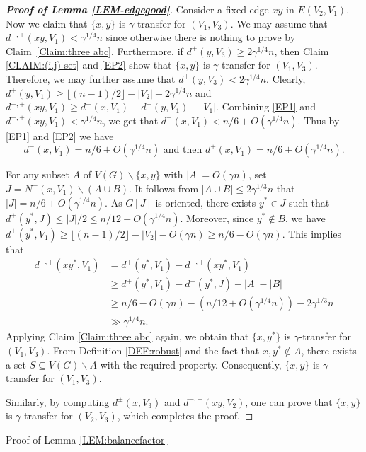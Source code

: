 \documentclass[11pt,a4paper,reqno]{amsart}
\makeatletter
\renewcommand\section{\@startsection{section}{1}%
  \z@{-1.0\linespacing\@plus-.7\linespacing}{1\linespacing}%
  {\normalfont\bfseries\large\centering}}
\theoremstyle{definition} %
\makeatother
\begin{document}
\begin{proof}[\textbf{Proof of Lemma \ref{LEM-edgegood}}]
Consider a fixed edge $xy$ in $E(V_2,V_1)$. Now we claim that $\{x,y\}$ is $\gamma$-transfer for $(V_1,V_3)$.  We may assume that $d^{-,+}(xy,V_1)<\gamma^{1/4}n$ since otherwise there is nothing to prove by Claim~\ref{Claim:three abc}. Furthermore,  if $d^+(y,V_{3})\geqslant2\gamma^{1/4}n$, then Claim \ref{CLAIM:(i,j)-set} and \ref{EP2} show that $\{x,y\}$ is $\gamma$-transfer for $(V_1,V_3)$.  Therefore, we may further assume that $d^+(y,V_{3})<2\gamma^{1/4}n$. Clearly,  $d^+(y,V_1)\geqslant \lfloor(n-1)/2\rfloor-|V_2|-2\gamma^{1/4}n$ and $d^{-,+}(xy,V_1)\geqslant d^-(x,V_1)+d^+(y,V_1)-|V_1|$. Combining \ref{EP1} and $d^{-,+}(xy,V_1)<\gamma^{1/4}n$, we get that $d^-(x,V_1)<n/6+O(\gamma^{1/4}n)$. Thus by \ref{EP1} and \ref{EP2} we have $$d^-(x,V_1)=n/6\pm O(\gamma^{1/4}n) \mbox{ and then } d^+(x,V_1)= n/6\pm O(\gamma^{1/4}n).$$ 

 For any subset $A$ of $V(G)\backslash \{x,y\}$ with $|A|=O(\gamma n)$, set $J=N^+(x,V_1)\backslash (A\cup B)$. It follows from $|A\cup B|\leqslant 2\gamma^{1/3}n$ that $|J|= n/6\pm O(\gamma^{1/4}n)$. As $G[J]$ is oriented, there exists $y^{\ast}\in J$ such that 
$d^+(y^{\ast},J)\leqslant |J|/2\leqslant n/12+O(\gamma^{1/4}n)$. Moreover, since $y^{\ast}\notin B$, we have $d^+(y^{\ast},V_1)\geqslant \lfloor (n-1)/2\rfloor-|V_2|-O(\gamma n)\geqslant n/6-O(\gamma n)$. This  implies that 
\begin{align*}
    d^{-,+}(xy^\ast,V_1)
    &= d^+(y^{\ast},V_1)-d^{+,+}(xy^\ast,V_1)\\
    &\geqslant d^+(y^{\ast},V_1)-d^+(y^{\ast},J)-|A|-|B|\\
    &\geqslant n/6-O(\gamma n)-(n/12+O(\gamma^{1/4}n))-2\gamma^{1/3}n \\
    &\gg \gamma^{1/4}n.
\end{align*}
Applying Claim \ref{Claim:three abc} again, we obtain that $\{x,y^\ast\}$ is $\gamma$-transfer for $(V_1,V_3)$. From Definition \ref{DEF:robust} and the fact that $x, y^\ast \notin A$, there exists a set $S\subseteq V(G)\backslash A$ with the required property. Consequently, $\{x,y\}$ is $\gamma$-transfer for $(V_1,V_3)$.


 Similarly, by computing  $d^\pm(x,V_3)$ and $d^{-,+}(xy,V_2)$, one can prove that $\{x,y\}$ is $\gamma$-transfer for $(V_2,V_3)$, which completes the proof. 
 \end{proof}
 

\section{Proof of Lemma \ref{LEM:balancefactor}}\label{SEC-5.5}
\end{document}
